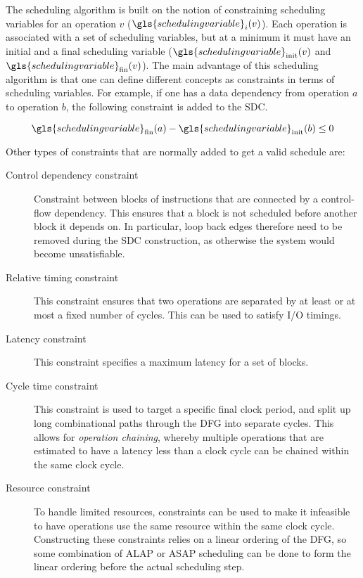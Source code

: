 The scheduling algorithm is built on the notion of constraining scheduling
variables for an operation $v$ ($\gls{scheduling variable}_i(v)$).  Each
operation is associated with a set of scheduling variables, but at a minimum it
must have an initial and a final scheduling variable
($\gls{scheduling variable}_{\mathrm{init}}(v)$ and
$\gls{scheduling variable}_{\mathrm{fin}}(v)$).  The main advantage of this
scheduling algorithm is that one can define different concepts as constraints in
terms of scheduling variables.  For example, if one has a data dependency from
operation $a$ to operation $b$, the following constraint is added to the
\gls{SDC}.

\begin{equation}
  \gls{scheduling variable}_{\mathrm{fin}}(a) - \gls{scheduling
    variable}_{\mathrm{init}}(b) \leq 0
\end{equation}

Other types of constraints that are normally added to get a valid schedule are:

\begin{description}
\item[Control dependency constraint] Constraint between blocks of instructions
  that are connected by a control-flow dependency.  This ensures that a block is
  not scheduled before another block it depends on.  In particular, loop back
  edges therefore need to be removed during the \gls{SDC} construction, as
  otherwise the system would become unsatisfiable.

\item[Relative timing constraint] This constraint ensures that two operations
  are separated by at least or at most a fixed number of cycles.  This can be
  used to satisfy I/O timings.

\item[Latency constraint] This constraint specifies a maximum latency for a set
  of blocks.

\item[Cycle time constraint] This constraint is used to target a specific final
  clock period, and split up long combinational paths through the \gls{DFG} into
  separate cycles.  This allows for \emph{\gls{operation chaining}}, whereby
  multiple operations that are estimated to have a latency less than a clock
  cycle can be chained within the same clock cycle.

\item[Resource constraint] To handle limited resources, constraints can be used
  to make it infeasible to have operations use the same resource within the same
  clock cycle.  Constructing these constraints relies on a linear ordering of
  the \gls{DFG}, so some combination of \gls{ALAP} or \gls{ASAP} scheduling can
  be done to form the linear ordering before the actual scheduling step.
\end{description}

